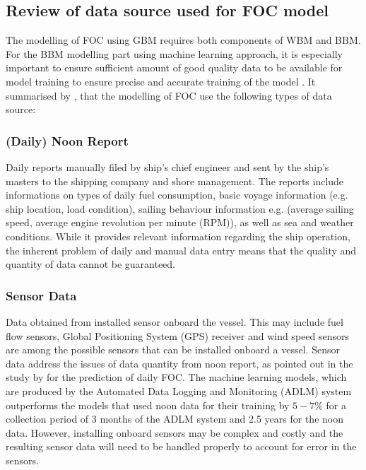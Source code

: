 \subsection{Review of data source used for FOC model}\label{sec:data_use}

The modelling of FOC using GBM requires both components of WBM and BBM. For the BBM modelling part using machine learning approach, it is especially important to ensure sufficient amount of good quality data to be available for model training to ensure precise and accurate training of the model . It summarised by , that the modelling of FOC use the following types of data source:\\

\subsubsection*{\textbf{(Daily) Noon Report}} Daily reports manually filed by ship's chief engineer and sent by the ship's masters to the shipping company and shore management. The reports include informations on types of daily fuel consumption, basic voyage information (e.g. ship location, load condition), sailing behaviour information e.g. (average sailing speed, average engine revolution per minute (RPM)), as well as sea and weather conditions. While it provides relevant information regarding the ship operation, the inherent problem of daily and manual data entry means that the quality and quantity of data cannot be guaranteed.\\

\subsubsection*{\textbf{Sensor Data}} Data obtained from installed sensor onboard the vessel. This may include fuel flow sensors, Global Positioning System (GPS) receiver and wind speed sensors are among the possible sensors that can be installed onboard a vessel. Sensor data address the issues of data quantity from noon report, as pointed out in the study by  for the prediction of daily FOC. The machine learning models, which are produced by the Automated Data Logging and Monitoring (ADLM) system outperforms the models that used noon data for their training by $5-7\%$ for a collection period of 3 months of the ADLM system and 2.5 years for the noon data. However, installing onboard sensors may be complex and costly  and the resulting sensor data will need to be handled properly to account for error in the sensors.\\

